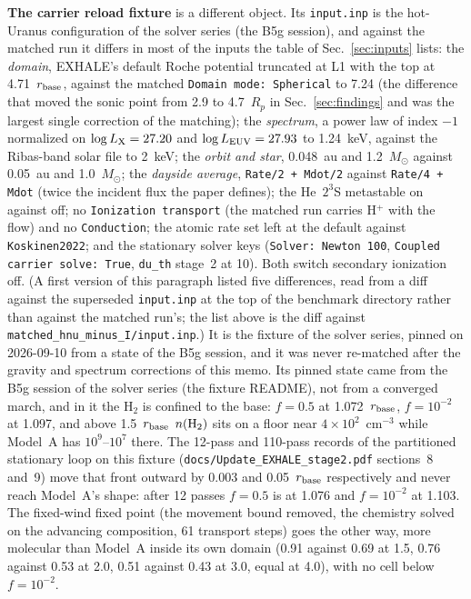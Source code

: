 \documentclass[english,a4paper]{my_memo}
\begin{document}
\textbf{The carrier reload fixture} is a different object. Its
\texttt{input.inp} is the hot-Uranus configuration of the solver series
(the B5g session), and against the matched run it differs in most of the
inputs the table of Sec.~\ref{sec:inputs} lists: the \emph{domain}, EXHALE's
default Roche potential truncated at L1 with the top at 4.71~$r_{\rm base}$,
against the matched \texttt{Domain mode: Spherical} to 7.24 (the difference
that moved the sonic point from 2.9 to 4.7~$R_p$ in Sec.~\ref{sec:findings}
and was the largest single correction of the matching); the
\emph{spectrum}, a power law of index $-1$ normalized on
$\log L_{\rm X} = 27.20$ and $\log L_{\rm EUV} = 27.93$ to 1.24~keV,
against the Ribas-band solar file to 2~keV; the \emph{orbit and star},
0.048~au and 1.2~$M_\odot$ against 0.05~au and 1.0~$M_\odot$; the
\emph{dayside average}, \texttt{Rate/2 + Mdot/2} against \texttt{Rate/4 +
Mdot} (twice the incident flux the paper defines); the He~$2^3$S metastable
on against off; no \texttt{Ionization transport} (the matched run carries
H$^+$ with the flow) and no \texttt{Conduction}; the atomic rate set left at
the default against \texttt{Koskinen2022}; and the stationary solver keys
(\texttt{Solver: Newton 100}, \texttt{Coupled carrier solve: True},
\texttt{du\_th} stage~2 at 10). Both switch secondary ionization off. (A
first version of this paragraph listed five differences, read from a diff
against the superseded \texttt{input.inp} at the top of the benchmark
directory rather than against the matched run's; the list above is the diff
against \texttt{matched\_hnu\_minus\_I/input.inp}.) It is the fixture of the
solver series, pinned on 2026-09-10 from a state of the B5g session, and it
was never re-matched after the gravity and spectrum corrections of this
memo. Its pinned state came from the
B5g session of the solver series (the fixture README), not from a converged
march, and in it the H$_2$ is confined to the base: $f = 0.5$ at
1.072~$r_{\rm base}$, $f = 10^{-2}$ at 1.097, and above 1.5~$r_{\rm base}$
$n({\rm H}_2)$ sits on a floor near $4\times10^{2}$~cm$^{-3}$ while Model~A
has $10^{9}$--$10^{7}$ there. The 12-pass and 110-pass records of the
partitioned stationary loop on this fixture
(\texttt{docs/Update\_EXHALE\_stage2.pdf} sections~8 and~9) move that front
outward by 0.003 and 0.05~$r_{\rm base}$ respectively and never reach Model~A's
shape: after 12 passes $f = 0.5$ is at 1.076 and $f = 10^{-2}$ at 1.103.
The fixed-wind fixed point (the movement bound removed, the chemistry
solved on the advancing composition, 61 transport steps) goes the other way,
more molecular than Model~A inside its own domain (0.91 against 0.69 at
1.5, 0.76 against 0.53 at 2.0, 0.51 against 0.43 at 3.0, equal at 4.0),
with no cell below $f = 10^{-2}$.
\end{document}
